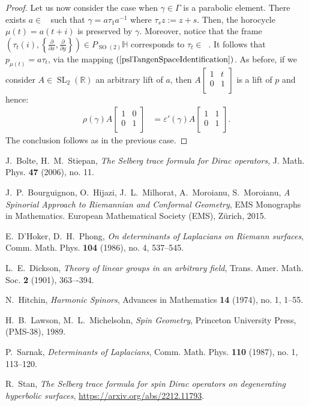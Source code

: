 \documentclass[12pt]{amsart}
\theoremstyle{definition}
\def\RR{{\mathbb R}}
\def\HH{{\mathbb{H}}}
\def\g{{\gamma}}
\def\G{{\Gamma}}
\DeclareMathOperator{\psl}{PSL_2(\mathbb{R})}
\newcommand{\slinear}{\operatorname{SL}}
\newcommand{\so}{\operatorname{SO}}
\begin{document}
\begin{proof}
Let us now consider the case when $\g\in \G$ is a parabolic element. There exists $a\in\psl$ such that $\g=a\tau_1 a^{-1}$ where $\tau_s z := z+s$. Then, the horocycle $\mu(t)=a(t+i)$ is preserved by $\g$.
Moreover, notice that the frame $\left( \tau_t(i), \left\lbrace \frac{\partial}{\partial x}, \frac{\partial}{\partial y} \right\rbrace\right) \in P_{\so(2)}\HH$ corresponds to $\tau_t \in \psl$. It follows that $p_{\mu(t)}=a\tau_t$, via the mapping $(\ref{pslTangenSpaceIdentification})$. As before, if we consider $A\in\slinear_2(\RR)$ an arbitrary lift of $a$, then
$A\begin{bmatrix}
1 & t \\
0 & 1 \\
\end{bmatrix}$
is a lift of $p$ and hence:
\begin{align*}
\rho(\g) A 
\begin{bmatrix}
1 & 0 \\
0 & 1 \\
\end{bmatrix}  &= \varepsilon'(\g) 
A
\begin{bmatrix}
1 & 1 \\
0 & 1 \\
\end{bmatrix}.
\end{align*}
The conclusion follows as in the previous case.
\end{proof}

\begin{thebibliography}{99}

J.~Bolte, H.~M.~Stiepan, \emph{The Selberg trace formula for Dirac operators}, J. Math. Phys. \textbf{47} (2006), no. 11.

J.~P.~Bourguignon, O.~Hijazi, J.~L.~Milhorat, A.~Moroianu, S.~Moroianu, \emph{A Spinorial Approach to Riemannian and Conformal Geometry}, EMS Monographs in Mathematics. European Mathematical Society (EMS), Zürich, 2015.

E.~D'Hoker, D.~H.~Phong, \emph{On determinants of Laplacians on Riemann surfaces}, Comm. Math. Phys. \textbf{104} (1986), no. 4, 537--545.

L.~E.~Dickson, \emph{Theory of linear groups in an arbitrary field}, Trans. Amer. Math. Soc. \textbf{2} (1901), 363–-394.

N.~Hitchin, \emph{Harmonic Spinors}, Advances in Mathematics \textbf{14} (1974), no. 1, 1--55.

H.~B.~Lawson, M.~L.~Michelsohn, \emph{Spin Geometry}, Princeton University Press, (PMS-38), 1989.

P.~Sarnak, \emph{Determinants of Laplacians},  Comm. Math. Phys. \textbf{110} (1987), no. 1, 113--120.


R.~Stan, \emph{The Selberg trace formula for spin Dirac operators on degenerating hyperbolic surfaces}, \url{https://arxiv.org/abs/2212.11793}.


\end{thebibliography}
 
\end{document}
